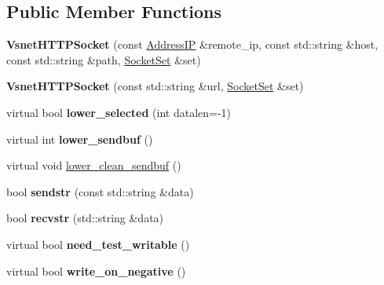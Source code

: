 \subsection*{Public Member Functions}
\begin{DoxyCompactItemize}
\item 
{\bfseries Vsnet\+H\+T\+T\+P\+Socket} (const \hyperlink{structAddressIP}{Address\+IP} \&remote\+\_\+ip, const std\+::string \&host, const std\+::string \&path, \hyperlink{classSocketSet}{Socket\+Set} \&set)\hypertarget{classVsnetHTTPSocket_ac7d98171f205876460a867e7f6cc9bbc}{}\label{classVsnetHTTPSocket_ac7d98171f205876460a867e7f6cc9bbc}

\item 
{\bfseries Vsnet\+H\+T\+T\+P\+Socket} (const std\+::string \&url, \hyperlink{classSocketSet}{Socket\+Set} \&set)\hypertarget{classVsnetHTTPSocket_a5e4bd95a90bd9077ad9ca804ab73ba73}{}\label{classVsnetHTTPSocket_a5e4bd95a90bd9077ad9ca804ab73ba73}

\item 
virtual bool {\bfseries lower\+\_\+selected} (int datalen=-\/1)\hypertarget{classVsnetHTTPSocket_ad47cffbd3a498692ac5292534ebddb29}{}\label{classVsnetHTTPSocket_ad47cffbd3a498692ac5292534ebddb29}

\item 
virtual int {\bfseries lower\+\_\+sendbuf} ()\hypertarget{classVsnetHTTPSocket_abf94aa058a1531dda5fcdd3467e85784}{}\label{classVsnetHTTPSocket_abf94aa058a1531dda5fcdd3467e85784}

\item 
virtual void \hyperlink{classVsnetHTTPSocket_a3303afe2d40b785929bf6b5bdeb1a42d}{lower\+\_\+clean\+\_\+sendbuf} ()
\item 
bool {\bfseries sendstr} (const std\+::string \&data)\hypertarget{classVsnetHTTPSocket_a8f94edffa7b33dff574cea00e1ba845f}{}\label{classVsnetHTTPSocket_a8f94edffa7b33dff574cea00e1ba845f}

\item 
bool {\bfseries recvstr} (std\+::string \&data)\hypertarget{classVsnetHTTPSocket_aec59aa2652c5c0c323f954fcff102a24}{}\label{classVsnetHTTPSocket_aec59aa2652c5c0c323f954fcff102a24}

\item 
virtual bool {\bfseries need\+\_\+test\+\_\+writable} ()\hypertarget{classVsnetHTTPSocket_a9b0f3d9be2ffc21a95d4f57878ab71f7}{}\label{classVsnetHTTPSocket_a9b0f3d9be2ffc21a95d4f57878ab71f7}

\item 
virtual bool {\bfseries write\+\_\+on\+\_\+negative} ()\hypertarget{classVsnetHTTPSocket_a52f1a00244cf50fa9f0cc91707805b21}{}\label{classVsnetHTTPSocket_a52f1a00244cf50fa9f0cc91707805b21}


\end{DoxyCompactItemize}
